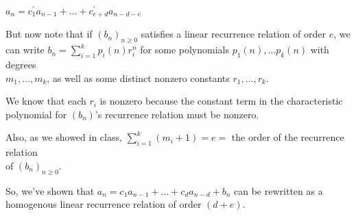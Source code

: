 \documentclass{book}
\newcommand{\exPP}{%
   \color{RedViolet}%
   \fontsize{12}{14}\selectfont%
}
\newenvironment{myIndent}{%
   \begin{adjustwidth}{2.5em}{0em}%
}{%
   \end{adjustwidth}%
}
\newenvironment{myTindent}{%
   \begin{adjustwidth}{7.5em}{0em}%
}{%
   \end{adjustwidth}%
}
\newcommand{\retTwo}{\hfill\bigbreak}
\begin{document}
\begin{myIndent}
   {\centering $a_n = c_1^\prime a_{n-1} + \ldots + c_{e+d}^\prime a_{n-d-e}$ \retTwo\par}

   But now note that if $(b_n)_{n \geq 0}$ satisfies a linear recurrence relation of order $e$, we\\ [-2pt] can write $b_n = \sum\limits_{i = 1}^k p_i(n)r_i^n$ for some polynomials $p_1(n),\ldots p_k(n)$ with degrees\\ [-2pt] $m_1, \ldots, m_k$, as well as some distinct nonzero constants $r_1, \ldots, r_k$.
   
   \begin{myTindent}\exPP
      We know that each $r_i$ is nonzero because the constant term in the characteristic polynomial for $(b_n)$'s recurrence relation must be nonzero.\retTwo
   \end{myTindent}

   Also, as we showed in class, $\sum\limits_{i = 1}^k(m_i + 1) = e =$ the order of the recurrence relation\\ [-6pt] of $(b_n)_{n \geq 0}$.\retTwo

   So, we've shown that $a_n = c_1a_{n-1} + \ldots + c_da_{n-d} + b_n$ can be rewritten as a\\ homogenous linear recurrence relation of order $(d + e)$.\retTwo
\end{myIndent}
\end{document}
